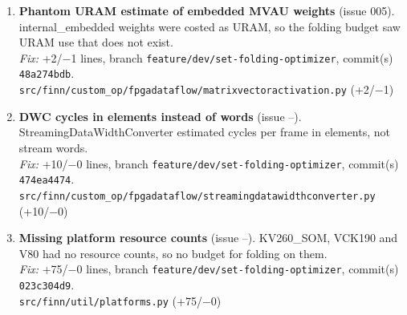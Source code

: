 \documentclass[a4paper,10pt]{article}
\begin{document}
\begin{enumerate}
\item \textbf{Phantom URAM estimate of embedded MVAU weights} (issue 005). internal\_embedded weights were costed as URAM, so the folding budget saw URAM use that does not exist.\\
\emph{Fix:} +2/$-$1 lines, branch \texttt{feature/dev/set-folding-optimizer}, commit(s) \texttt{48a274bdb}.\\
{\footnotesize \texttt{src/finn/custom\_op/fpgadataflow/matrixvectoractivation.py} (+2/$-$1)}
\item \textbf{DWC cycles in elements instead of words} (issue --). StreamingDataWidthConverter estimated cycles per frame in elements, not stream words.\\
\emph{Fix:} +10/$-$0 lines, branch \texttt{feature/dev/set-folding-optimizer}, commit(s) \texttt{474ea4474}.\\
{\footnotesize \texttt{src/finn/custom\_op/fpgadataflow/streamingdatawidthconverter.py} (+10/$-$0)}
\item \textbf{Missing platform resource counts} (issue --). KV260\_SOM, VCK190 and V80 had no resource counts, so no budget for folding on them.\\
\emph{Fix:} +75/$-$0 lines, branch \texttt{feature/dev/set-folding-optimizer}, commit(s) \texttt{023c304d9}.\\
{\footnotesize \texttt{src/finn/util/platforms.py} (+75/$-$0)}
\end{enumerate}
\end{document}
